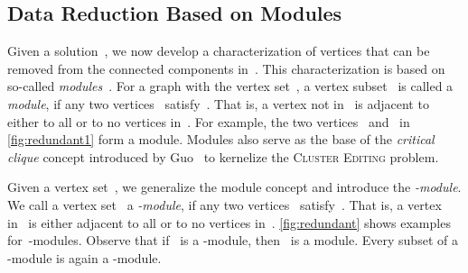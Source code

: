 \documentclass[12pt, a4paper, abstracton]{scrreprt}
\renewcommand{\cite}{~\citep}
\newcommand{\md}[1]{\mbox{-module}}
\newcommand{\name}{\textsc}
\theoremstyle{definition}
\theoremstyle{remark}
\begin{document}
\subsection{Data Reduction Based on Modules}
\label{strong}
Given a solution~, we now develop a characterization of vertices that can be removed from the connected components in~. This characterization is based on so-called \emph{modules}\cite{Gal67,DBLP:journals/dm/McConnellS99}. For a graph with the vertex set~, a vertex subset~ is called a \emph{module}, if any two vertices~ satisfy~. That is, a vertex not in~ is adjacent to either to all or to no vertices in~. For example, the two vertices~ and~ in \autoref{fig:redundant1} form a module. Modules also serve as the base of the \emph{critical clique} concept introduced by Guo\cite{Guo09} to kernelize the \name{Cluster Editing} problem.

Given a vertex set~, we generalize the module concept and introduce the \emph{\md W}. We call a vertex set~ a \emph{\md{W}}, if any two vertices~ satisfy~. That is, a vertex in~ is either adjacent to all or to no vertices in~. \autoref{fig:redundant} shows examples for~-modules. Observe that if~ is a -module, then~ is a module. Every subset of a -module is again a -module.
\end{document}
